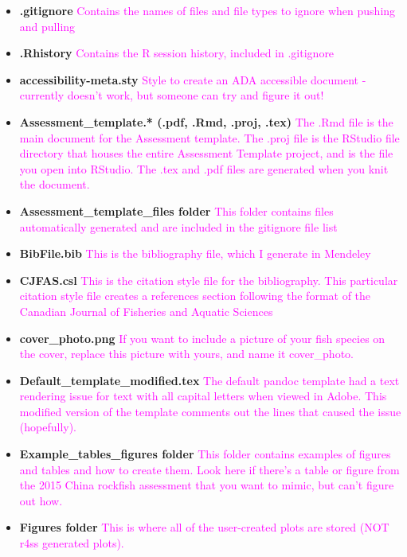 \documentclass[12pt,]{article}
\begin{document}
\begin{itemize}
\item
  \textbf{.gitignore}
  \textcolor{magenta}{Contains the names of files and file types to ignore when pushing and pulling}
\item
  \textbf{.Rhistory}
  \textcolor{magenta}{Contains the R session history, included in .gitignore}
\item
  \textbf{accessibility-meta.sty}
  \textcolor{magenta}{Style to create an ADA accessible document - currently doesn't work, but someone can try and figure it out!}
\item
  \textbf{Assessment\_template.* (.pdf, .Rmd, .proj, .tex)}
  \textcolor{magenta}{The .Rmd file is the main document for the Assessment template.  The .proj file is the RStudio file directory that houses the entire Assessment Template project, and is the file you open into RStudio.  The .tex and .pdf files are generated when you knit the document.}
\item
  \textbf{Assessment\_template\_files folder}
  \textcolor{magenta}{This folder contains files automatically generated and are included in the gitignore file list}
\item
  \textbf{BibFile.bib}
  \textcolor{magenta}{This is the bibliography file, which I generate in Mendeley}
\item
  \textbf{CJFAS.csl}
  \textcolor{magenta}{This is the citation style file for the bibliography.  This particular citation style file creates a references section following the format of the Canadian Journal of Fisheries and Aquatic Sciences}
\item
  \textbf{cover\_photo.png}
  \textcolor{magenta}{If you want to include a picture of your fish species on the cover, replace this picture with yours, and name it cover\_photo.}
\item
  \textbf{Default\_template\_modified.tex}
  \textcolor{magenta}{The default pandoc template had a text rendering issue for text with all capital letters when viewed in Adobe.  This modified version of the template comments out the lines that caused the issue (hopefully).}
\item
  \textbf{Example\_tables\_figures folder}
  \textcolor{magenta}{This folder contains examples of figures and tables and how to create them.  Look here if there's a table or figure from the 2015 China rockfish assessment that you want to mimic, but can't figure out how.}
\item
  \textbf{Figures folder}
  \textcolor{magenta}{This is where all of the user-created plots are stored (NOT r4ss generated plots).}

\end{itemize}
\end{document}
